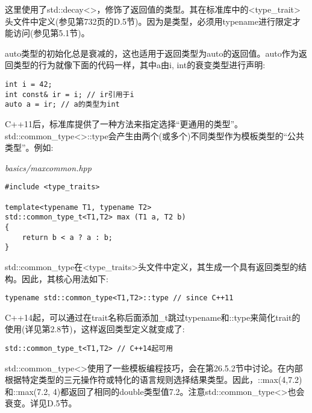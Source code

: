 这里使用了std::decay<>，修饰了返回值的类型。其在标准库中的<type\_trait>头文件中定义(参见第732页的D.5节)。因为是类型，必须用typename进行限定才能访问(参见第5.1节)。

auto类型的初始化总是衰减的，这也适用于返回类型为auto的返回值。auto作为返回类型的行为就像下面的代码一样，其中a由i, int的衰变类型进行声明:

\begin{lstlisting}[style=styleCXX]
int i = 42;
int const& ir = i; // ir引用于i
auto a = ir; // a的类型为int
\end{lstlisting}


C++11后，标准库提供了一种方法来指定选择“更通用的类型”。std::common\_type<>::type会产生由两个(或多个)不同类型作为模板类型的“公共类型”。例如:

\noindent
\textit{basics/maxcommon.hpp}
\begin{lstlisting}[style=styleCXX]
#include <type_traits>

template<typename T1, typename T2>
std::common_type_t<T1,T2> max (T1 a, T2 b)
{
	return b < a ? a : b;
}
\end{lstlisting}

std::common\_type在<type\_traits>头文件中定义，其生成一个具有返回类型的结构。因此，其核心用法如下:

\begin{lstlisting}[style=styleCXX]
typename std::common_type<T1,T2>::type // since C++11
\end{lstlisting}

C++14起，可以通过在trait名称后面添加\_t跳过typename和::type来简化trait的使用(详见第2.8节)，这样返回类型定义就变成了:

\begin{lstlisting}[style=styleCXX]
std::common_type_t<T1,T2> // C++14起可用
\end{lstlisting}

std::common\_type<>使用了一些模板编程技巧，会在第26.5.2节中讨论。在内部根据特定类型的三元操作符或特化的语言规则选择结果类型。因此，::max(4,7.2)和::max(7.2, 4)都返回了相同的double类型值7.2。注意std::common\_type<>也会衰变。详见D.5节。




